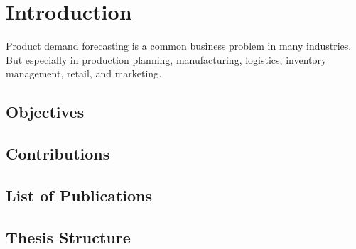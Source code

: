 
\chapter{Introduction}
\label{ch:introduction}


Product demand forecasting is a common business problem in many industries.
But especially in production planning, manufacturing, logistics, inventory management, retail, and marketing.

\section[Objectives]{Objectives}




\section[Contributions]{Contributions}


\section[Publications]{List of Publications}

\section[Thesis Structure]{Thesis Structure}


